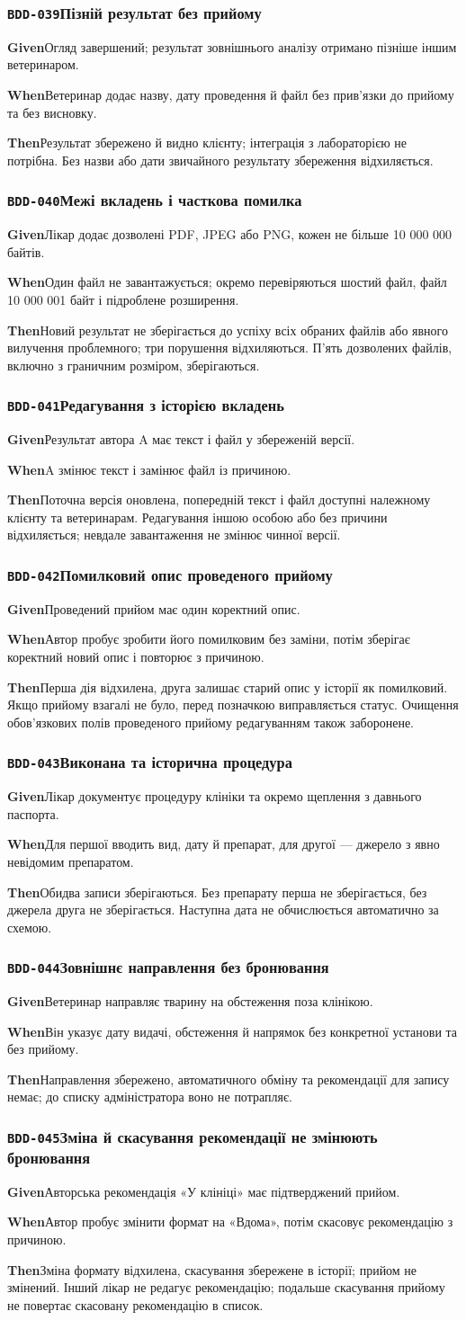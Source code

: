 \documentclass[11pt,a4paper]{article}
\newcommand{\scenario}[5]{%
  \Needspace{8\baselineskip}%
  \subsubsection*{\hypertarget{#1}{\texttt{#1}}\quad #2}%
  \textbf{Given}\quad #3\par
  \textbf{When}\quad #4\par
  \textbf{Then}\quad #5\par\medskip}
\begin{document}
\scenario{BDD-039}{Пізній результат без прийому}{Огляд завершений; результат зовнішнього аналізу отримано пізніше іншим ветеринаром.}{Ветеринар додає назву, дату проведення й файл без прив’язки до прийому та без висновку.}{Результат збережено й видно клієнту; інтеграція з лабораторією не потрібна. Без назви або дати звичайного результату збереження відхиляється.}

\scenario{BDD-040}{Межі вкладень і часткова помилка}{Лікар додає дозволені PDF, JPEG або PNG, кожен не більше 10 000 000 байтів.}{Один файл не завантажується; окремо перевіряються шостий файл, файл 10 000 001 байт і підроблене розширення.}{Новий результат не зберігається до успіху всіх обраних файлів або явного вилучення проблемного; три порушення відхиляються. П’ять дозволених файлів, включно з граничним розміром, зберігаються.}

\scenario{BDD-041}{Редагування з історією вкладень}{Результат автора A має текст і файл у збереженій версії.}{A змінює текст і замінює файл із причиною.}{Поточна версія оновлена, попередній текст і файл доступні належному клієнту та ветеринарам. Редагування іншою особою або без причини відхиляється; невдале завантаження не змінює чинної версії.}

\scenario{BDD-042}{Помилковий опис проведеного прийому}{Проведений прийом має один коректний опис.}{Автор пробує зробити його помилковим без заміни, потім зберігає коректний новий опис і повторює з причиною.}{Перша дія відхилена, друга залишає старий опис у історії як помилковий. Якщо прийому взагалі не було, перед позначкою виправляється статус. Очищення обов’язкових полів проведеного прийому редагуванням також заборонене.}

\scenario{BDD-043}{Виконана та історична процедура}{Лікар документує процедуру клініки та окремо щеплення з давнього паспорта.}{Для першої вводить вид, дату й препарат, для другої — джерело з явно невідомим препаратом.}{Обидва записи зберігаються. Без препарату перша не зберігається, без джерела друга не зберігається. Наступна дата не обчислюється автоматично за схемою.}

\scenario{BDD-044}{Зовнішнє направлення без бронювання}{Ветеринар направляє тварину на обстеження поза клінікою.}{Він указує дату видачі, обстеження й напрямок без конкретної установи та без прийому.}{Направлення збережено, автоматичного обміну та рекомендації для запису немає; до списку адміністратора воно не потрапляє.}

\scenario{BDD-045}{Зміна й скасування рекомендації не змінюють бронювання}{Авторська рекомендація «У клініці» має підтверджений прийом.}{Автор пробує змінити формат на «Вдома», потім скасовує рекомендацію з причиною.}{Зміна формату відхилена, скасування збережене в історії; прийом не змінений. Інший лікар не редагує рекомендацію; подальше скасування прийому не повертає скасовану рекомендацію в список.}
\end{document}
